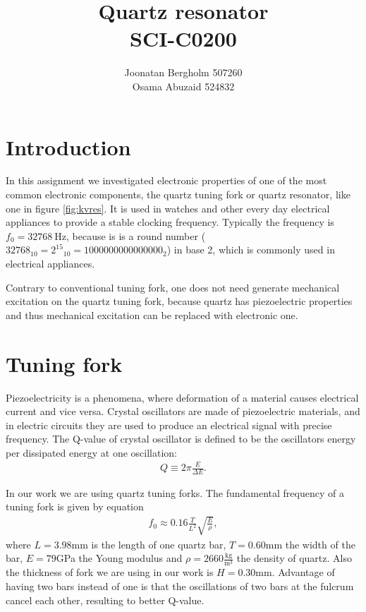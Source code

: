 \documentclass[12pt]{article}
\title{\textbf{Quartz resonator} \\ SCI-C0200}
\author{Joonatan Bergholm 507260 \\ Osama Abuzaid 524832}
\begin{document}
\maketitle
\newpage


\tableofcontents
\newpage

\section{Introduction}

In this assignment we investigated electronic properties of one of the most common electronic components, the quartz tuning fork or quartz resonator, like one in figure \ref{fig:kvres}. It is used in watches and other every day electrical appliances to provide a stable clocking frequency. Typically the frequency is $f_0 = \SI{32768}{\hertz}$, because is is a round number ($32768_{10} = {2^{15}}_{10} = 1000000000000000_2$) in base 2, which is commonly used in electrical appliances.

Contrary to conventional tuning fork, one does not need generate mechanical excitation
on the quartz tuning fork, because quartz has piezoelectric properties and thus mechanical excitation can be replaced with electronic one.
\section{Tuning fork}
Piezoelectricity is a phenomena, where deformation of a material causes electrical current and vice versa. Crystal oscillators are made of piezoelectric materials, and in electric circuits they are used to produce an electrical signal with precise frequency. The Q-value of crystal oscillator is defined to be the oscillators energy per dissipated energy at one oscillation:
\begin{align}
Q \equiv 2\pi\frac{E}{\Delta E}.
\end{align}

In our work we are using quartz tuning forks. The fundamental frequency of a tuning fork is given by equation
\begin{align}
f_0 \approx 0.16\frac{T}{L^2}\sqrt{\frac{E}{\rho}},
\end{align}
where $L = 3.98 $mm is the length of one quartz bar, $T = 0.60 $mm the width of the bar, $E = 79 $GPa the Young modulus and $\rho = 2660\frac{\mathrm{kg}}{\mathrm{m}^3}$ the density of quartz. Also the thickness of fork we are using in our work is $H = 0.30$mm. Advantage of having two bars instead of one is that the oscillations of two bars at the fulcrum cancel each other, resulting to better Q-value.
\end{document}

